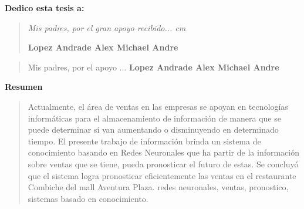 \newpage
 \pagestyle{plain}
 
 {\bf\Large {Dedico esta tesis a:}}
 \vskip 1cm
\begin{quotation}
{\it Mis padres, por el gran apoyo recibido...
 cm

\vskip 1cm
\textbf{Lopez Andrade Alex Michael Andre }}
\end{quotation}
\newpage

\newpage

 {\bf\Large {}}
 \vskip 1.5cm
 {\bf\Large {}}
\begin{quotation}
Mis padres, por el apoyo ...
\vskip 1cm
\textbf{Lopez Andrade Alex Michael Andre }  %
 \end{quotation}
 


%



\newpage
\begin{center}
 {\bf\LARGE Resumen}
\end{center} 
\vskip 0.5cm
\begin{quotation}
Actualmente, el área de ventas en las empresas se apoyan en tecnologías informáticas para el almacenamiento de información de manera que se puede determinar sí van aumentando o disminuyendo en determinado tiempo. El presente trabajo de información brinda un sistema de conocimiento basando en Redes Neuronales que ha partir de la información sobre ventas que se tiene, pueda pronosticar el futuro de estas.
Se concluyó que el sistema logra pronosticar eficientemente las ventas en el restaurante Combiche del mall Aventura Plaza.
\vskip 0.3cm
\hspace*{-0.6cm}{\bf Palabras claves:} redes neuronales, ventas, pronostico, sistemas basado en conocimiento.
\end{quotation}


